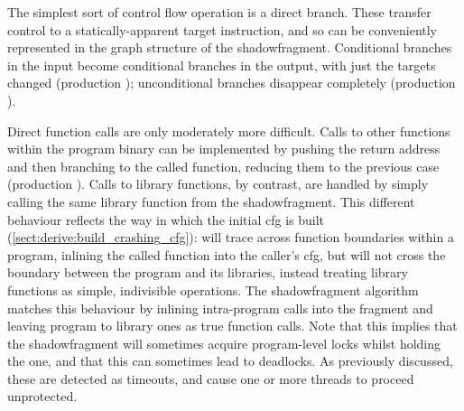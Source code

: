 The simplest sort of control flow operation is a direct branch.  These
transfer control to a statically-apparent target instruction, and so
can be conveniently represented in the graph structure of the
\gls{shadowfragment}.  Conditional branches in the input become
conditional branches in the output, with just the targets changed
(production ); unconditional branches disappear
completely (production ).

Direct function calls are only moderately more difficult.  Calls to
other functions within the program binary can be implemented by
pushing the return address and then branching to the called function,
reducing them to the previous case (production ).
Calls to library functions, by contrast, are handled by simply calling
the same library function from the \gls{shadowfragment}.  This
different behaviour reflects the way in which the initial \gls{cfg} is
built (\autoref{sect:derive:build_crashing_cfg}): {\technique} will
trace across function boundaries within a program, inlining the called
function into the caller's \gls{cfg}, but will not cross the boundary
between the program and its libraries, instead treating library
functions as simple, indivisible operations.  The \gls{shadowfragment}
algorithm matches this behaviour by inlining intra-program calls into
the fragment and leaving program to library ones as true function
calls.  Note that this implies that the \gls{shadowfragment} will
sometimes acquire program-level locks whilst holding the {\technique}
one, and that this can sometimes lead to deadlocks.  As previously
discussed, these are detected as timeouts, and cause one or more
threads to proceed unprotected.

